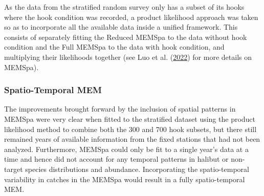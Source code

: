 \documentclass[12pt]{article}\usepackage[]{graphicx}\usepackage[]{color}
\begin{document}
As the data from the stratified random survey only has a subset of its hooks where the hook condition was recorded, a product likelihood approach was taken so as to incorporate all the available data inside a unified framework. This consists of separately fitting the Reduced MEMSpa to the data without hook condition and the Full MEMSpa to the data with hook condition, and multiplying their likelihoods together (see Luo et al. (\protect\hyperlink{ref-Luo2022}{2022}) for more details on MEMSpa).

\hypertarget{spatio-temporal-mem}{%
\subsubsection{Spatio-Temporal MEM}\label{spatio-temporal-mem}}

The improvements brought forward by the inclusion of spatial patterns in MEMSpa were very clear when fitted to the stratified dataset using the product likelihood method to combine both the 300 and 700 hook subsets, but there still remained years of available information from the fixed stations that had not been analyzed. Furthermore, MEMSpa could only be fit to a single year's data at a time and hence did not account for any temporal patterns in halibut or non-target species distributions and abundance. Incorporating the spatio-temporal variability in catches in the MEMSpa would result in a fully spatio-temporal MEM.
\end{document}
